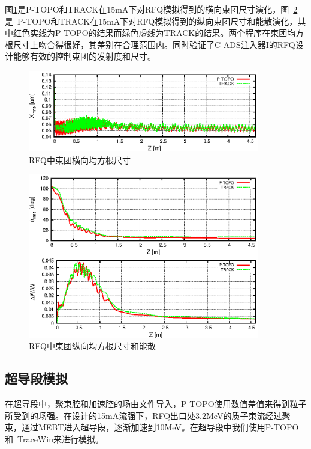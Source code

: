 图\ref{fig:ADS_RFQ_size1}是P-TOPO和TRACK在15mA下对RFQ模拟得到的横向束团尺寸演化，图~\ref{fig:ADS_RFQ_size2}是~P-TOPO和TRACK在15mA下对RFQ模拟得到的纵向束团尺寸和能散演化，其中红色实线为P-TOPO的结果而绿色虚线为TRACK的结果。两个程序在束团均方根尺寸上吻合得很好，其差别在合理范围内。同时验证了C-ADS注入器I的RFQ设计能够有效的控制束团的发射度和尺寸。

\begin{figure}[!htb]
    \centering
    \includegraphics[width=0.9\textwidth]{Img/ADS_RFQ_size1.eps}
    \caption{RFQ中束团横向均方根尺寸}
    \label{fig:ADS_RFQ_size1}
\end{figure}

\begin{figure}[!htb]
    \centering
    \includegraphics[width=0.9\textwidth]{Img/ADS_RFQ_size2.eps}
    \caption{RFQ中束团纵向均方根尺寸和能散}
    \label{fig:ADS_RFQ_size2}
\end{figure}

\subsection{超导段模拟}
在超导段中，聚束腔和加速腔的场由文件导入，P-TOPO使用数值差值来得到粒子所受到的场强。在设计的15mA流强下，RFQ出口处3.2MeV的质子束流经过聚束，通过MEBT进入超导段，逐渐加速到10MeV。在超导段中我们使用P-TOPO和~TraceWin来进行模拟。

